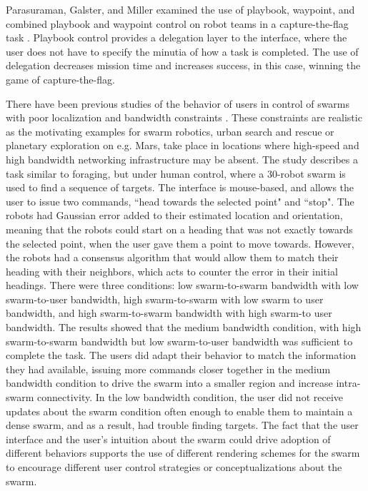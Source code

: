 Parasuraman, Galster, and Miller examined the use of playbook, waypoint, and combined playbook and waypoint control on robot teams in a capture-the-flag task \citep{parasuraman2005flexible}.
Playbook control provides a delegation layer to the interface, where the user does not have to specify the minutia of how a task is completed. 
The use of delegation decreases mission time and increases success, in this case, winning the game of capture-the-flag.

There have been previous studies of the behavior of users in control of swarms with poor localization and bandwidth constraints \citep{nunnally2012human}. 
These constraints are realistic as the motivating examples for swarm robotics, urban search and rescue or planetary exploration on e.g. Mars, take place in locations where high-speed and high bandwidth networking infrastructure may be absent. 
The study describes a task similar to foraging, but under human control, where a 30-robot swarm is used to find a sequence of targets. 
The interface is mouse-based, and allows the user to issue two commands, ``head towards the selected point" and ``stop". 
The robots had Gaussian error added to their estimated location and orientation, meaning that the robots could start on a heading that was not exactly towards the selected point, when the user gave them a point to move towards. 
However, the robots had a consensus algorithm that would allow them to match their heading with their neighbors, which acts to counter the error in their initial headings. 
There were three conditions: low swarm-to-swarm bandwidth with low swarm-to-user bandwidth, high swarm-to-swarm with low swarm to user bandwidth, and high swarm-to-swarm bandwidth with high swarm-to user bandwidth.
The results showed that the medium bandwidth condition, with high swarm-to-swarm bandwidth but low swarm-to-user bandwidth was sufficient to complete the task. 
The users did adapt their behavior to match the information they had available, issuing more commands closer together in the medium bandwidth condition to drive the swarm into a smaller region and increase intra-swarm connectivity. 
In the low bandwidth condition, the user did not receive updates about the swarm condition often enough to enable them to maintain a dense swarm, and as a result, had trouble finding targets. 
The fact that the user interface and the user's intuition about the swarm could drive adoption of different behaviors supports the use of different rendering schemes for the swarm to encourage different user control strategies or conceptualizations about the swarm. 


